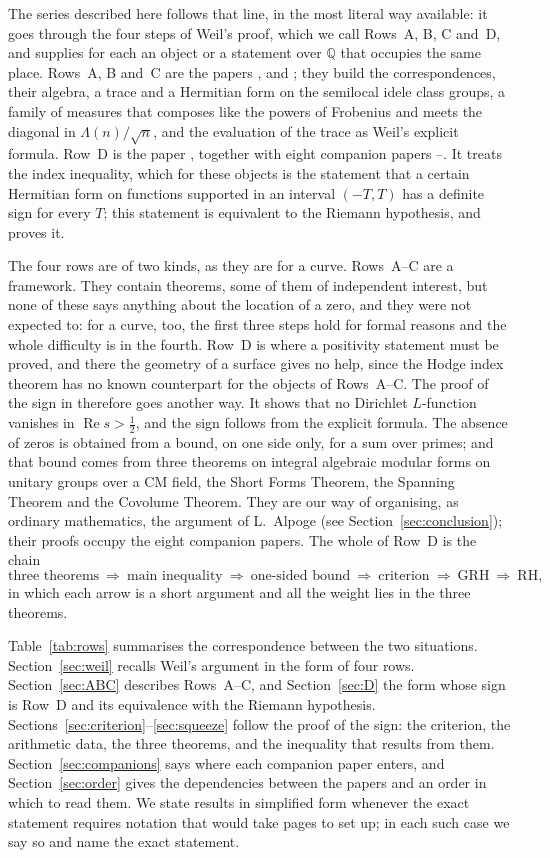 \documentclass[10pt]{amsart}
\theoremstyle{definition}
\theoremstyle{remark}
\newcommand{\Q}{\mathbb Q}
\newcommand{\Rel}{\operatorname{Re}}
\begin{document}
The series described here follows that line, in the most literal way available: it goes through
the four steps of Weil's proof, which we call Rows~A, B, C and~D, and supplies for each an
object or a statement over $\Q$ that occupies the same place. Rows~A, B and~C are the papers
\cite{P43}, \cite{P44} and \cite{Paper45}; they build the correspondences, their algebra, a
trace and a Hermitian form on the semilocal idele class groups, a family of measures that composes
like the powers of Frobenius and meets the diagonal in $\Lambda(n)/\sqrt n$, and the evaluation
of the trace as Weil's explicit formula. Row~D is the paper \cite{P46}, together with eight companion
papers \cite{P49}--\cite{P56}. It treats the index inequality, which for these objects is the
statement that a certain Hermitian form on functions supported in an interval $(-T,T)$ has a
definite sign for every $T$; this statement is equivalent to the Riemann hypothesis, and
\cite{P46} proves it.

The four rows are of two kinds, as they are for a curve. Rows~A--C are a framework. They
contain theorems, some of them of independent interest, but none of these says anything about
the location of a zero, and they were not expected to: for a curve, too, the first three steps
hold for formal reasons and the whole difficulty is in the fourth. Row~D is where a
positivity statement must be proved, and there the geometry of a surface gives no help, since
the Hodge index theorem has no known counterpart for the objects of Rows~A--C. The proof of the
sign in \cite{P46} therefore goes another way. It shows that no Dirichlet $L$-function
vanishes in $\Rel s>\tfrac12$, and the sign follows from the explicit formula. The absence of
zeros is obtained from a bound, on one side only, for a sum over primes; and that bound comes
from three theorems on integral algebraic modular forms on unitary groups over a CM field,
the Short Forms Theorem, the Spanning Theorem and the Covolume Theorem. They are our way of
organising, as ordinary mathematics, the argument of L.~Alpoge (see
Section~\ref{sec:conclusion}); their proofs occupy the eight companion papers. The whole of
Row~D is the chain
\[
\text{three theorems}\ \Longrightarrow\ \text{main inequality}\ \Longrightarrow\
\text{one-sided bound}\ \Longrightarrow\ \text{criterion}\ \Longrightarrow\ \mathrm{GRH}
\ \Longrightarrow\ \mathrm{RH},
\]
in which each arrow is a short argument and all the weight lies in the three theorems.

Table~\ref{tab:rows} summarises the correspondence between the two situations. Section~\ref{sec:weil}
recalls Weil's argument in the form of four rows. Section~\ref{sec:ABC} describes Rows~A--C,
and Section~\ref{sec:D} the form whose sign is Row~D and its equivalence with the Riemann
hypothesis. Sections~\ref{sec:criterion}--\ref{sec:squeeze} follow the proof of the sign: the
criterion, the arithmetic data, the three theorems, and the inequality that results from them.
Section~\ref{sec:companions} says where each companion paper enters, and
Section~\ref{sec:order} gives the dependencies between the papers and an order in which to read them.
We state results in simplified form whenever the exact statement requires notation that would
take pages to set up; in each such case we say so and name the exact statement.
\end{document}
